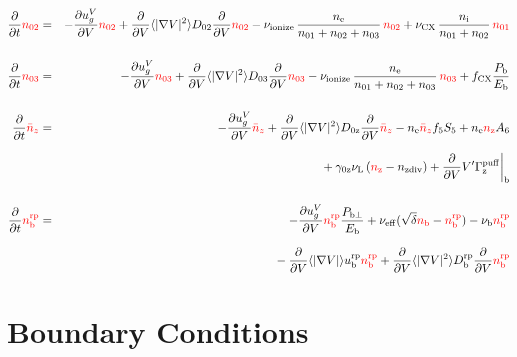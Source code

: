 \documentclass[11pt]{article}
\def\r#1{{\rm#1}}
\def\aves#1{\langle#1\rangle}
\def\dd#1#2{\frac{\partial #1}{\partial #2}}
\def\ddV{\frac{\partial}{\partial V}}
\def\ddt{\frac{\partial}{\partial t}}
\def\nee{n_\r{e}}
\def\ni{n_\r{i}}
\def\nz{n_\r{z}}
\def\nb{n_\r{b}}
\def\ugV{u_{g}^V}
\def\ndiv#1{n_\r{#1div}}
\def\nbrp{n_\r{b}^\r{rp}}
\def\ubrp{u_\r{b}^\r{rp}}
\def\Dbrp{D_\r{b}^\r{rp}}
\def\Pbperp{P_{\r{b}\perp}}
\def\Pb{P_\r{b}}
\def\Eb{E_\r{b}}
\def\nna{n_{01}}
\def\nnb{n_{02}}
\def\nnc{n_{03}}
\def\nnz{\bar{n}_{z}}
\def\nueff{\nu_\r{eff}}
\def\fCX{f_\r{CX}}
\def\nuL{\nu_\r{L}}
\def\nuCX{\nu_\r{CX}}
\def\nuion{\nu_\r{ionize}}
\def\nub{\nu_\r{b}}
\def\red#1{\textcolor{red}{#1}}
\begin{document}
\begin{eqnarray}
  \ddt \red{\nnb} &=& 
%
  - \dd{\ugV}{V} \red{\nnb}
%
  + \ddV \aves{|\nabla V|^2} D_{02} \ddV \red{\nnb}
%
  - \nuion\, \frac{\nee}{\nna + \nnb + \nnc}\, \red{\nnb}
%
  + \nuCX\, \frac{\ni}{\nna + \nnb}\, \red{\nna}
%
\\[5mm]
  \ddt \red{\nnc} &=& 
%
  - \dd{\ugV}{V} \red{\nnc}
%
  + \ddV \aves{|\nabla V|^2} D_{03} \ddV \red{\nnc}
%
  - \nuion\, \frac{\nee}{\nna + \nnb + \nnc}\, \red{\nnc}
%
  + \fCX \frac{\Pb}{\Eb}
\\[5mm]
  \ddt \red{\nnz} &=& 
%
  - \dd{\ugV}{V} \red{\nnz}
%
  + \ddV \aves{|\nabla V|^2} D_{0\r{z}} \ddV \red{\nnz}
%
  - \nee \red{\nnz} f_5S_5 + \nee \red{\nz} A_6 
\nonumber\\[2.5mm]&&{}
%
  + \gamma_\r{0z} \nuL \, (\red{\nz} - \ndiv{z})
%
  + \ddV V' \Gamma^\r{puff}_\r{z}\biggr|_\r{b}
\\[5mm]
  \ddt \red{\nbrp} &=&
%
  - \dd{\ugV}{V} \red{\nbrp}
%
    \frac{\Pbperp}{\Eb}
%
  + \nueff (\sqrt{\delta} \red{\nb} - \red{\nbrp})
%
  - \nub \red{\nbrp}
%
\nonumber\\[2.5mm]&&{}
  - \ddV \aves{|\nabla V|} \ubrp \red{\nbrp} 
  + \ddV \aves{|\nabla V|^2} \Dbrp \ddV \red{\nbrp}
\end{eqnarray}

\bigskip

\section{Boundary Conditions}
\end{document}
